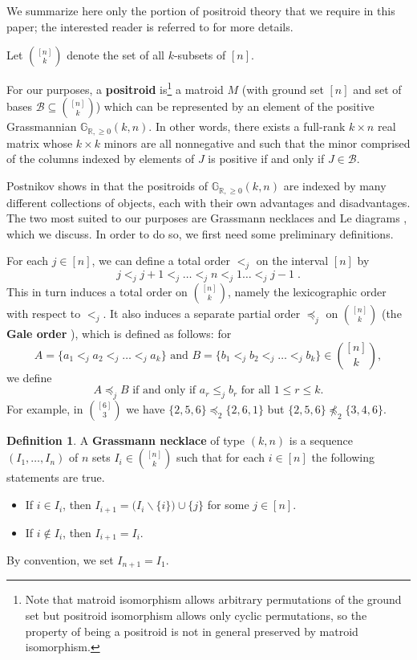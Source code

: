 \documentclass[11pt]{article}
\newcommand{\R}{\mathbb{R}}
\newcommand{\Gr}{\mathbb{G}_{\R, \geq 0}}
\newcommand{\cB}{\mathcal{B}}
\newcommand{\gale}[1]{\preccurlyeq_{#1}}
\theoremstyle{remark}
\theoremstyle{definition}
\newtheorem{dfn}[thm]{Definition}
\begin{document}
We summarize here only the portion of positroid theory that we require in this paper; the interested reader is referred to \cite[sections 6, 16]{Postnikov} for more details. 

Let $\binom{[n]}{k}$ denote the set of all $k$-subsets of $[n]$.  

For our purposes, a {\bf positroid} is\footnote{Note that matroid isomorphism allows arbitrary permutations of the ground set but positroid isomorphism allows only cyclic permutations, so the property of being a positroid is not in general preserved by matroid isomorphism.} a matroid $M$ (with ground set $[n]$ and set of bases $\cB \subseteq \binom{[n]}{k}$) which can be represented by an element of the positive Grassmannian $\Gr(k,n)$. In other words, there exists a full-rank $k\times n$ real matrix whose $k\times k$ minors are all nonnegative and such that the minor comprised of the columns indexed by elements of $J$ 
is positive if and only if $J \in \cB$.

Postnikov shows in \cite{Postnikov} that the positroids of $\Gr(k,n)$ are indexed by many different collections of objects, each with their own advantages and disadvantages. The two most suited to our purposes are Grassmann necklaces \cite[section 16]{Postnikov} and Le diagrams \cite[section 6]{Postnikov}, which we discuss. In order to do so, we first need some preliminary definitions.

For each $j \in [n]$, we can define a total order $<_j$ on the interval $[n]$ by
\[ j <_j j+1 <_j \dots <_j n <_j 1 \dots <_j j-1\;.\]
This in turn induces a total order on $\binom{[n]}{k}$, namely the lexicographic order with respect to $<_j$.  It also induces a separate partial order $\gale{j}$ on $\binom{[n]}{k}$ (the {\bf Gale order} \cite{Gale}), which is defined as follows: for 
\[A = \{a_1 <_j a_2 <_j \dots <_j a_k\} \text{ and } B = \{b_1 <_j b_2 <_j \dots <_j b_k\} \in \binom{[n]}{k},\] we define
\[A \gale{j} B \text{ if and only if } a_r \leq_j b_r \text{ for all }1 \leq r \leq k.\]
For example, in $\binom{[6]}{3}$ we have $\{2,5,6\}\gale{2} \{2,6,1\}$ but $\{2,5,6\}\not\gale{2}\{3,4,6\}$.


\begin{dfn}\label{def:grassmann necklace}
A {\bf Grassmann necklace} of type $(k,n)$ is a sequence $(I_1, \dots, I_n)$ of $n$ sets $I_i \in \binom{[n]}{k}$ such that for each $i \in [n]$ the following statements are true.
\begin{itemize}
\item If $i \in I_i$, then $I_{i+1} = \big(I_i \backslash \{i\}\big) \cup \{j\}$ for some $j \in[n]$.
\item If $i \not\in I_i$, then $I_{i+1} = I_i$.
\end{itemize}
By convention, we set $I_{n+1} = I_1$.
\end{dfn}
\end{document}
